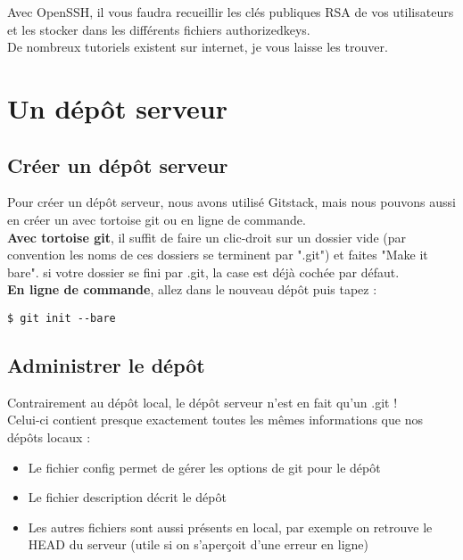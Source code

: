 Avec OpenSSH, il vous faudra recueillir les clés publiques RSA de vos utilisateurs et les stocker dans les différents fichiers authorizedkeys.\\
De nombreux tutoriels existent sur internet, je vous laisse les trouver.

\chapter{Un dépôt serveur}
\section{Créer un dépôt serveur}
Pour créer un dépôt serveur, nous avons utilisé Gitstack, mais nous pouvons aussi en créer un avec tortoise git ou en ligne de commande.\\

\textbf{Avec tortoise git}, il suffit de faire un clic-droit sur un dossier vide (par convention les noms de ces dossiers se terminent par ".git") et faites "Make it bare". si votre dossier se fini par .git, la case est déjà cochée par défaut.\\

\textbf{En ligne de commande}, allez dans le nouveau dépôt puis tapez :
\begin{verbatim}
$ git init --bare
\end{verbatim} 

\section{Administrer le dépôt}
Contrairement au dépôt local, le dépôt serveur n'est en fait qu'un .git !\\
Celui-ci contient presque exactement toutes les mêmes informations que nos dépôts locaux :
\begin{itemize}
\item Le fichier config permet de gérer les options de git pour le dépôt
\item Le fichier description décrit le dépôt
\item Les autres fichiers sont aussi présents en local, par exemple on retrouve le HEAD du serveur (utile si on s'aperçoit d'une erreur en ligne)
\end{itemize}